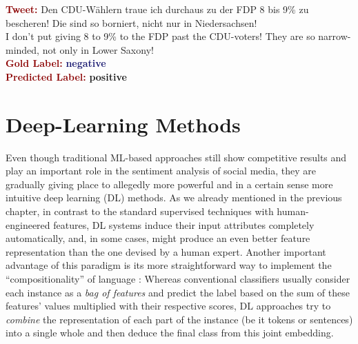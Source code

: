 \begin{example}\label{snt:cgsa:exmp:guenther-error}
  \noindent\textup{\bfseries\textcolor{darkred}{Tweet:}} {\upshape Den CDU-W\"ahlern traue ich durchaus zu der FDP 8 bis 9\% zu bescheren! Die sind so borniert, nicht nur in Niedersachsen!}\\
  \noindent I don't put giving 8 to 9\% to the FDP past the CDU-voters!  They are so narrow-minded, not only in Lower Saxony!\\[\exampleSep]
  \noindent\textup{\bfseries\textcolor{darkred}{Gold Label:}}\hspace*{4.3em}\textbf{%
    \upshape\textcolor{midnightblue}{negative}}\\
 \noindent\textup{\bfseries\textcolor{darkred}{Predicted Label:}}\hspace*{2em}\textbf{%
    \upshape\textcolor{green3}{positive}}
\end{example}


\section{Deep-Learning Methods}\label{sec:cgsa:dl-based}

Even though traditional ML-based approaches still show competitive
results and play an important role in the sentiment analysis of social
media, they are gradually giving place to allegedly more powerful and
in a certain sense more intuitive deep learning (DL) methods.  As we
already mentioned in the previous chapter, in contrast to the standard
supervised techniques with human-engineered features, DL systems
induce their input attributes completely automatically, and, in some
cases, might produce an even better feature representation than the
one devised by a human expert.  Another important advantage of this
paradigm is its more straightforward way to implement the
``compositionality'' of language \cite{Frege:1892}: Whereas
conventional classifiers usually consider each instance as a \emph{bag
  of features} and predict the label based on the sum of these
features' values multiplied with their respective scores, DL
approaches try to \emph{combine} the representation of each part of
the instance (be it tokens or sentences) into a single whole and then
deduce the final class from this joint embedding.

